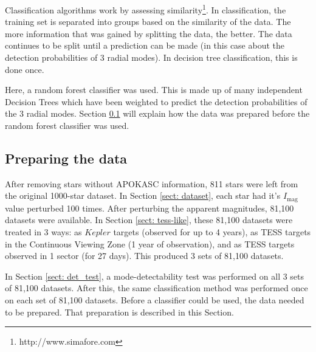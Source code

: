 \documentclass[a4paper,fleqn,usenatbib,useAMS]{mnras}
\newcommand{\imag}{\ensuremath{I_{\textrm{mag}}\:}}
\begin{document}
Classification algorithms work by assessing similarity\footnote{http://www.simafore.com}. In classification, the training set is separated into groups based on the similarity of the data. The more information that was gained by splitting the data, the better. The data continues to be split until a prediction can be made (in this case about the detection probabilities of 3 radial modes). In decision tree classification, this is done once. 

Here, a random forest classifier was used. This is made up of many independent Decision Trees which have been weighted to predict the detection probabilities of the 3 radial modes. Section \ref{sect: prep} will explain how the data was prepared before the random forest classifier was used.



\subsection{Preparing the data}
\label{sect: prep}

After removing stars without APOKASC information, 811 stars were left from the original 1000-star dataset. In Section \ref{sect: dataset}, each star had it's \imag value perturbed 100 times. After perturbing the apparent magnitudes, 81,100 datasets were available. In Section \ref{sect: tess-like}, these 81,100 datasets were treated in 3 ways: as $Kepler$ targets (observed for up to 4 years), as TESS targets in the Continuous Viewing Zone (1 year of observation), and as TESS targets observed in 1 sector (for 27 days). This produced 3 sets of 81,100 datasets.

In Section \ref{sect: det_test}, a mode-detectability test was performed on all 3 sets of 81,100 datasets. After this, the same classification method was performed once on each set of 81,100 datasets. Before a classifier could be used, the data needed to be prepared. That preparation is described in this Section.
\end{document}
